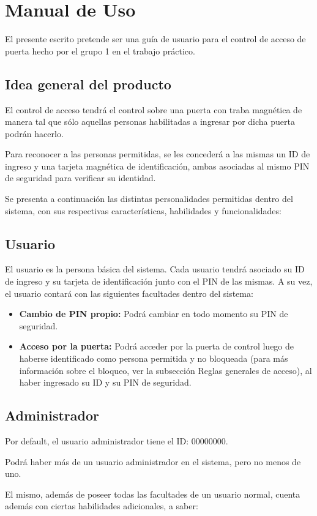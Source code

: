 \documentclass[10pt,a4paper]{article}
\author{Tomás González Orlando}
\begin{document}
\section{Manual de Uso}

El presente escrito pretende ser una guía de usuario para el control de acceso de puerta hecho por el grupo 1 en el trabajo práctico.
\subsection{Idea general del producto}
El control de acceso tendrá el control sobre una puerta con traba magnética de manera tal que sólo aquellas personas habilitadas a ingresar por dicha puerta podrán hacerlo. \par
Para reconocer a las personas permitidas, se les concederá a las mismas un ID de ingreso y una tarjeta magnética de identificación, ambas asociadas al mismo PIN de seguridad para verificar su identidad. \par
Se presenta a continuación las distintas personalidades permitidas dentro del sistema, con sus respectivas características, habilidades y funcionalidades:\par

\subsection{Usuario}
El usuario es la persona básica del sistema. Cada usuario tendrá asociado su ID de ingreso y su tarjeta de identificación junto con el PIN de las mismas. A su vez, el usuario contará con las siguientes facultades dentro del sistema:
\begin{itemize}
\item \textbf{Cambio de PIN propio: } Podrá cambiar en todo momento su PIN de seguridad.
\item \textbf{Acceso por la puerta: } Podrá acceder por la puerta de control luego de haberse identificado como persona permitida y no bloqueada (para más información sobre el bloqueo, ver la subsección Reglas generales de acceso), al haber ingresado su ID y su PIN de seguridad.
\end{itemize}


\subsection{Administrador}
Por default, el usuario administrador tiene el ID: 00000000. \par
Podrá haber más de un usuario administrador en el sistema, pero no menos de uno.\par
El mismo, además de poseer todas las facultades de un usuario normal, cuenta además con ciertas habilidades adicionales, a saber:
\end{document}
